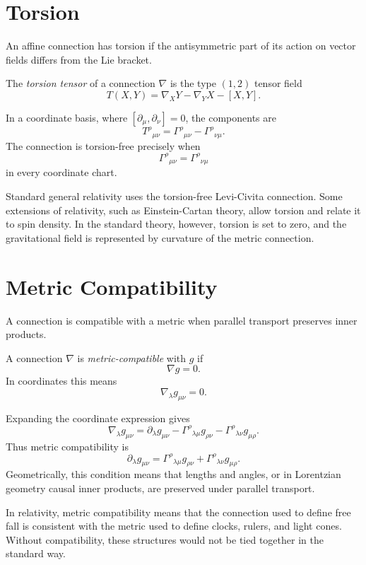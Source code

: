 \section{Torsion}

An affine connection has torsion if the antisymmetric part of its action on
vector fields differs from the Lie bracket.

\begin{definitionbox}
The \emph{torsion tensor} of a connection \(\nabla\) is the type \((1,2)\)
tensor field
\[
T(X,Y)=\nabla_XY-\nabla_YX-[X,Y].
\]
\end{definitionbox}

In a coordinate basis, where \([\partial_\mu,\partial_\nu]=0\), the components are
\[
T^\rho{}_{\mu\nu}=\Gamma^\rho{}_{\mu\nu}-\Gamma^\rho{}_{\nu\mu}.
\]
The connection is torsion-free precisely when
\[
\Gamma^\rho{}_{\mu\nu}=\Gamma^\rho{}_{\nu\mu}
\]
in every coordinate chart.

Standard general relativity uses the torsion-free Levi-Civita connection. Some
extensions of relativity, such as Einstein-Cartan theory, allow torsion and
relate it to spin density. In the standard theory, however, torsion is set to
zero, and the gravitational field is represented by curvature of the metric
connection.

\clearpage

\section{Metric Compatibility}

A connection is compatible with a metric when parallel transport preserves inner
products.

\begin{definitionbox}
A connection \(\nabla\) is \emph{metric-compatible} with \(g\) if
\[
\nabla g=0.
\]
In coordinates this means
\[
\nabla_\lambda g_{\mu\nu}=0.
\]
\end{definitionbox}

Expanding the coordinate expression gives
\[
\nabla_\lambda g_{\mu\nu}
=
\partial_\lambda g_{\mu\nu}
-\Gamma^\rho{}_{\lambda\mu}g_{\rho\nu}
-\Gamma^\rho{}_{\lambda\nu}g_{\mu\rho}.
\]
Thus metric compatibility is
\[
\partial_\lambda g_{\mu\nu}
=
\Gamma^\rho{}_{\lambda\mu}g_{\rho\nu}
+\Gamma^\rho{}_{\lambda\nu}g_{\mu\rho}.
\]
Geometrically, this condition means that lengths and angles, or in Lorentzian
geometry causal inner products, are preserved under parallel transport.

In relativity, metric compatibility means that the connection used to define
free fall is consistent with the metric used to define clocks, rulers, and light
cones. Without compatibility, these structures would not be tied together in the
standard way.

